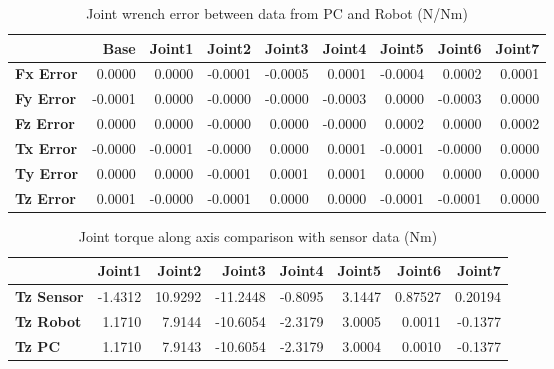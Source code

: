 \begin{table}[h!]
	\centering
	\caption{Joint wrench error between data from PC and Robot (N/Nm)}
	\label{wrech_Error_Pose10}
	\begin{tabular}{|l|r|r|r|r|r|r|r|r|}
		\hline
		\textbf{}  & \textbf{Base} & \textbf{Joint1}  & \textbf{Joint2}  & \textbf{Joint3}  & \textbf{Joint4}  & \textbf{Joint5}  & \textbf{Joint6}  & \textbf{Joint7} \\ \hline
		\textbf{Fx Error}  & 0.0000        & 0.0000        & -0.0001        & -0.0005        & 0.0001        & -0.0004        & 0.0002        & 0.0001 \\ \hline
		\textbf{Fy Error}  & -0.0001        & 0.0000        & -0.0000        & -0.0000        & -0.0003        & 0.0000        & -0.0003        & 0.0000 \\ \hline
		\textbf{Fz Error}  & 0.0000        & 0.0000        & -0.0000        & 0.0000        & -0.0000        & 0.0002        & 0.0000        & 0.0002 \\ \hline
		\textbf{Tx Error}  & -0.0000        & -0.0001        & -0.0000        & 0.0000        & 0.0001        & -0.0001        & -0.0000        & 0.0000 \\ \hline
		\textbf{Ty Error}  & 0.0000        & 0.0000        & -0.0001        & 0.0001        & 0.0001        & 0.0000        & 0.0000        & 0.0000 \\ \hline
		\textbf{Tz Error}  & 0.0001        & -0.0000        & -0.0001        & 0.0000        & 0.0000        & -0.0001        & -0.0001        & 0.0000 \\ \hline
	\end{tabular}
\end{table}

\begin{table}[h!]
	\centering
	\caption{Joint torque along axis comparison with sensor data (Nm)}
	\label{wrech_Sensor_Pose10}
	\begin{tabular}{|l|r|r|r|r|r|r|r|}
		\hline
		\textbf{} & \textbf{Joint1} & \textbf{Joint2} & \textbf{Joint3} & \textbf{Joint4} & \textbf{Joint5} & \textbf{Joint6} & \textbf{Joint7} \\ \hline
		\textbf{Tz Sensor}  & -1.4312           & 10.9292           & -11.2448            & -0.8095           & 3.1447           & 0.87527           & 0.20194           \\ \hline
		\textbf{Tz Robot}  	& 1.1710           & 7.9144           & -10.6054            & -2.3179           & 3.0005           & 0.0011           & -0.1377           \\ \hline
		\textbf{Tz PC}  	& 1.1710           & 7.9143           & -10.6054            & -2.3179           & 3.0004           & 0.0010           & -0.1377           \\ \hline
	\end{tabular}
\end{table}

